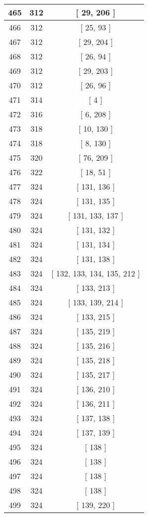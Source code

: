 \begin{center}
\begin{longtable}[H]{|| c c c ||}
\hline
465 & 312 & [ 29, 206 ] \\ 
\hline
466 & 312 & [ 25, 93 ] \\ 
\hline
467 & 312 & [ 29, 204 ] \\ 
\hline
468 & 312 & [ 26, 94 ] \\ 
\hline
469 & 312 & [ 29, 203 ] \\ 
\hline
470 & 312 & [ 26, 96 ] \\ 
\hline
471 & 314 & [ 4 ] \\ 
\hline
472 & 316 & [ 6, 208 ] \\ 
\hline
473 & 318 & [ 10, 130 ] \\ 
\hline
474 & 318 & [ 8, 130 ] \\ 
\hline
475 & 320 & [ 76, 209 ] \\ 
\hline
476 & 322 & [ 18, 51 ] \\ 
\hline
477 & 324 & [ 131, 136 ] \\ 
\hline
478 & 324 & [ 131, 135 ] \\ 
\hline
479 & 324 & [ 131, 133, 137 ] \\ 
\hline
480 & 324 & [ 131, 132 ] \\ 
\hline
481 & 324 & [ 131, 134 ] \\ 
\hline
482 & 324 & [ 131, 138 ] \\ 
\hline
483 & 324 & [ 132, 133, 134, 135, 212 ] \\ 
\hline
484 & 324 & [ 133, 213 ] \\ 
\hline
485 & 324 & [ 133, 139, 214 ] \\ 
\hline
486 & 324 & [ 133, 215 ] \\ 
\hline
487 & 324 & [ 135, 219 ] \\ 
\hline
488 & 324 & [ 135, 216 ] \\ 
\hline
489 & 324 & [ 135, 218 ] \\ 
\hline
490 & 324 & [ 135, 217 ] \\ 
\hline
491 & 324 & [ 136, 210 ] \\ 
\hline
492 & 324 & [ 136, 211 ] \\ 
\hline
493 & 324 & [ 137, 138 ] \\ 
\hline
494 & 324 & [ 137, 139 ] \\ 
\hline
495 & 324 & [ 138 ] \\ 
\hline
496 & 324 & [ 138 ] \\ 
\hline
497 & 324 & [ 138 ] \\ 
\hline
498 & 324 & [ 138 ] \\ 
\hline
499 & 324 & [ 139, 220 ] \\ 

\end{longtable}
\end{center}

